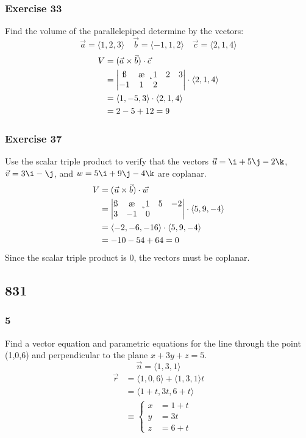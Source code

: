 \documentclass[letterpaper, 12pt]{math}
\begin{document}
\subsubsection*{Exercise 33}
Find the volume of the parallelepiped determine by the vectors:
\[ \vec{a} = \langle1,2,3\rangle \quad \vec{b} = \langle-1,1,2\rangle
  \quad \vec{c} = \langle2,1,4\rangle \]
\begin{align*}
  V &= (\vec{a}\times\vec{b})\cdot\vec{c} \\
  &= \begin{vmatrix}
    \i & \j & \k \\
    1 & 2 & 3 \\
    -1 & 1 & 2
  \end{vmatrix}\cdot\langle2,1,4\rangle \\
  &= \langle1,-5,3\rangle\cdot\langle2,1,4\rangle \\
  &= 2-5+12 = 9
\end{align*}

\subsubsection*{Exercise 37}
Use the scalar triple product to verify that the vectors \( \vec{u} = \i+5\j-
2\k \), \( \vec{v} = 3\i-\j \), and \( w = 5\i+9\j-4\k \) are coplanar.
\begin{align*}
  V &= (\vec{u}\times\vec{b})\cdot\vec{w} \\
  &= \begin{vmatrix}
    \i & \j & \k \\
    1 & 5 & -2 \\
    3 & -1 & 0
  \end{vmatrix}\cdot\langle5,9,-4\rangle \\
  &= \langle-2,-6,-16\rangle\cdot\langle5,9,-4\rangle \\
  &= -10-54+64 = 0
\end{align*}
Since the scalar triple product is 0, the vectors must be coplanar.

\subsection*{831}

\subsubsection*{5}
Find a vector equation and parametric equations for the line through the
point (1,0,6) and perpendicular to the plane \( x+3y+z = 5 \).
\[ \vec{n} = \langle1,3,1\rangle \]
\begin{align*}
  \vec{r} &= \langle1,0,6\rangle+\langle1,3,1\rangle t \\
  &= \langle1+t,3t,6+t\rangle \\
  &\equiv \begin{cases}
    x &= 1+t \\
    y &= 3t \\
    z &= 6+t
  \end{cases}
\end{align*}
\end{document}

